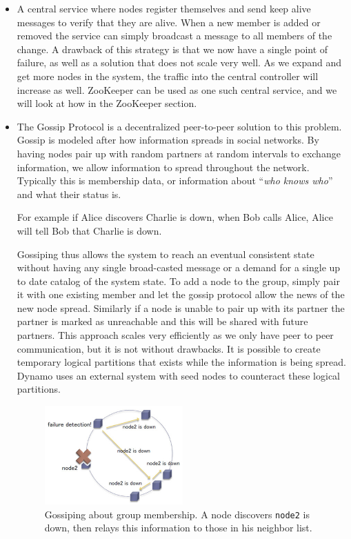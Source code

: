 \begin{itemize}
\item A central service where nodes register themselves and send keep alive messages to verify that they are alive. When a new member is added or removed the service can simply broadcast a message to all members of the change. A drawback of this strategy is that we now have a single point of failure, as well as a solution that does not scale very well. As we expand and get more nodes in the system, the traffic into the central controller will increase as well. ZooKeeper can be used as one such central service, and we will look at how in the ZooKeeper section.
\item The Gossip Protocol is a decentralized peer-to-peer solution to this problem. Gossip is modeled after how information spreads in social networks. By having nodes pair up with random partners at random intervals to exchange information, we allow information to spread throughout the network. Typically this is membership data, or information about ``\emph{who knows who}'' and what their status is.

For example if Alice discovers Charlie is down, when Bob calls Alice, Alice will tell Bob that Charlie is down.

Gossiping thus allows the system to reach an eventual consistent state without having any single broad-casted message or a demand for a single up to date catalog of the system state. To add a node to the group, simply pair it with one existing member and let the gossip protocol allow the news of the new node spread. Similarly if a node is unable to pair up with its partner the partner is marked as unreachable and this will be shared with future partners. This approach scales very efficiently as we only have peer to peer communication, but it is not without drawbacks. It is possible to create temporary logical partitions that exists while the information is being spread. Dynamo uses an external system with seed nodes to counteract these logical partitions. 

\begin{figure}[h]
    \centering
    \includegraphics[width=0.5\textwidth]{introduction/gossip}
    \caption{Gossiping about group membership. A node discovers \texttt{node2} is down, then relays this information to those in his neighbor list.}
    \label{fig:gossip}
\end{figure}


\end{itemize}
